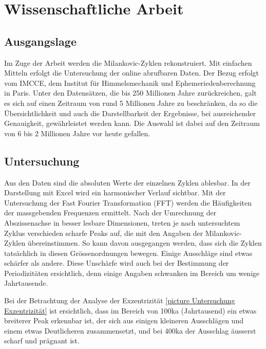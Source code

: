 %
%
%
%
\section{Wissenschaftliche Arbeit 
\label{milankovic:section:Wissenschaftliche Arbeit}}

\subsection{Ausgangslage
\label{milankovic:subsection:Ausgangslage}}
Im Zuge der Arbeit werden die Milankovic-Zyklen rekonstruiert.
Mit einfachen Mitteln erfolgt die Untersuchung der online abrufbaren Daten.
Der Bezug erfolgt vom IMCCE, dem Institut für Himmelsmechanik und Ephemeriedenberechnung in Paris.
Unter den Datensätzen, die bis 250 Millionen Jahre zurückreichen, galt es sich auf einen Zeitraum von rund 5 Millionen Jahre zu beschränken, da so die Übersichtlichkeit und auch die Darstellbarkeit der Ergebnisse, bei ausreichender Genauigkeit, gewährleistet werden kann.
Die Auswahl ist dabei auf den Zeitraum von 6 bis 2 Millionen Jahre vor heute gefallen.

\subsection{Untersuchung
\label{milankovic:subsection:Untersuchung}}
Aus den Daten sind die absoluten Werte der einzelnen Zyklen ablesbar.
In der Darstellung mit Excel wird ein harmonischer Verlauf sichtbar.
Mit der Untersuchung der Fast Fourier Transformation (FFT) werden die Häufigkeiten der massgebenden Frequenzen ermittelt.
Nach der Umrechnung der Abszissenachse in besser lesbare Dimensionen, treten je nach untersuchtem Zyklus verschieden scharfe Peaks auf, die mit den Angaben der Milankovic-Zyklen übereinstimmen.
So kann davon ausgegangen werden, dass sich die Zyklen tatsächlich in diesen Grössenordnungen bewegen.
Einige Ausschläge sind etwas schärfer als andere.
Diese Unschärfe wird auch bei der Bestimmung der Periodizitäten ersichtlich, denn einige Angaben schwanken im Bereich um wenige Jahrtausende. 

Bei der Betrachtung der Analyse der Exzentrizität
\ref{picture Untersuchung Exzentrizität}
ist ersichtlich, dass im Bereich von 100ka (Jahrtausend) ein etwas breiterer Peak erkennbar ist, der sich aus einigen kleineren Ausschlägen und einem etwas Deutlicheren zusammensetzt, und bei 400ka der Ausschlag äusserst scharf und prägnant ist.

